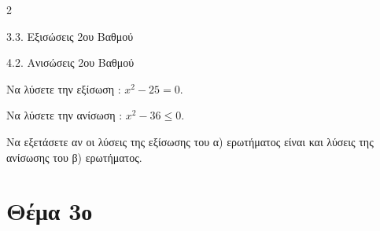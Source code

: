\begin{ylh}{2}
    \item 3.3. Εξισώσεις 2ου Βαθμού
    \item 4.2. Ανισώσεις 2ου Βαθμού
\end{ylh}

\begin{alist}
\item Να λύσετε την εξίσωση : $x^{2} - 25 = 0$.
\item Να λύσετε την ανίσωση : $x^{2} - 36 \leq 0$.
\item Να εξετάσετε αν οι λύσεις της εξίσωσης του α) ερωτήματος είναι και λύσεις της ανίσωσης του β) ερωτήματος.

\end{alist}


\newpage
\section{Θέμα 3ο}

